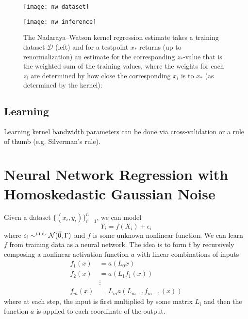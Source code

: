 \begin{figure}[h]
\begin{minipage}[c]{.35\textwidth}
\texttt{[image: nw\_dataset]}
\end{minipage}%
\hfill
\begin{minipage}[c]{.55\textwidth}
\caption[Nadaraya--Watson Kernel Regression]{The Nadaraya--Watson kernel regression estimate takes a training dataset $\mathcal{D}$ (left) and for a testpoint $x_*$ returns (up to renormalization) an estimate for the corresponding $z_*$-value that is the weighted sum of the training values, where the weights for each $z_i$ are determined by how close the corresponding $x_i$ is to $x_*$ (as determined by the kernel):
}
\texttt{[image: nw\_inference]}
\end{minipage}
\end{figure}

\subsection{Learning}
Learning kernel bandwidth parameters can be done via cross-validation or a rule of thumb (e.g. Silverman's rule).

\section{Neural Network Regression with Homoskedastic Gaussian Noise} 
Given a dataset $\{(x_i,y_i)\}_{i=1}^n$, we can model
\begin{equation}
    Y_i = f(X_i) + \epsilon_i
\end{equation}
where $\epsilon_i\sim^\text{i.i.d.}\mathcal{N}(\vec 0, \Gamma)$ and $f$ is some unknown nonlinear function.  We can learn $f$ from training data  as a neural network.  The idea is to form f by recursively composing a nonlinear activation function $a$ with linear combinations of inputs
\begin{align}
    f_1(x) &= a(L_0x) \\ 
    f_2(x) &= a(L_1f_1(x)) \\
    &\vdots \\
    f_m(x) &= L_m a(L_{m-1}f_{m-1}(x))
\end{align}
where at each step, the input is first multiplied by some matrix $L_i$ and then the function $a$ is applied to each coordinate of the output.  

